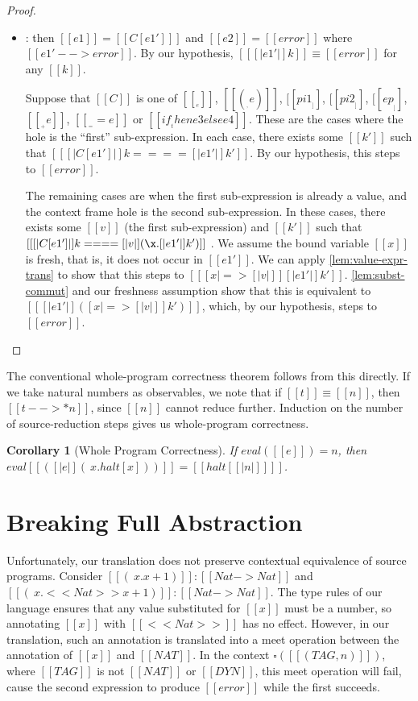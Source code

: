 \documentclass[11pt]{article}
\newtheorem{corollary}{Corollary}[section]
\newcommand{\rrule}[1]{\rref*{#1}}
\begin{document}
\begin{proof}
\begin{itemize}
		\item \rrule{RedContextFail}: then $[[e1]]=[[C[e1'] ]] $ and $[[e2]]=[[error]] $ where $[[e1' --> error]]$.
		By our hypothesis, $[[ [|e1'|]k ]] \equiv [[ error ]]$ for any $[[k]]$.

		Suppose that $[[C]]$ is one of $[[ __ e]]$, $[[(__, e)]]$, $[[pi1 __]]$, $[[pi2 __]]$, $[[ep __]]$,
		$[[__ + e]]$, $[[__ == e]]$ or $[[if __ then e3 else e4]]$. These are the cases where the hole is the ``first''
		sub-expression. 
		In each case, there exists some $[[k']]$ such that $[[ [|C[e1'] |]k ==== [|e1'|]k' ]]$. By our hypothesis,
		this steps to $[[error]]$.

		
		The remaining cases are when the first sub-expression is already a value, and the context frame hole is the second sub-expression.
		In these cases, there exists some $[[v]]$ (the first sub-expression) and $[[k']]$
		such that $[[ [|C[e1'] |]k ==== [|v|](\x . [|e1'|]k' ) ]]$ .
		We assume the bound variable $[[x]]$ is fresh, that is, it does not occur in $[[e1']]$.
		We can apply \autoref{lem:value-expr-trans} to show that this steps to $[[ [x |=> [|v|] ][|e1'|]k' ]]$.
		 \autoref{lem:subst-commut} and our freshness assumption 
		show that this is equivalent to
		$[[ [| e1' |]([x |=> [|v|] ]k') ]]$, which, by our hypothesis,
		steps to $[[error]]$.
		

		  
	\end{itemize}
\end{proof}

The conventional whole-program correctness theorem follows from this directly.
If we take natural numbers as observables, we note that if $[[t]]\equiv[[n]]$, then $[[t -->* n]]$,
since $[[n]]$ cannot reduce further. Induction on the number of source-reduction steps gives us whole-program correctness.

\begin{corollary}[Whole Program Correctness] 
	If ${eval([[e]])=n}$, then ${eval[[ ([|e|](\ x . halt [x]) )]]=[[halt [ [|n|] ] ]]}$.
\end{corollary}
 
\section{Breaking Full Abstraction}

Unfortunately, our translation does not preserve contextual equivalence of source programs.
Consider $[[(\ x . x + 1)]] : [[Nat -> Nat]]$ and $[[(\ x . <<Nat>>x + 1)]] : [[Nat -> Nat]]$.
The type rules of our language ensures that any value substituted for $[[x]]$ must be a number,
so annotating $[[x]]$ with $[[<<Nat>>]]$ has no effect.
However, in our translation, such an annotation is translated into a meet operation between the annotation
of $[[x]]$ and $[[NAT]]$. In the context $\square([[(TAG, n)]])$, where $[[TAG]]$ is not $[[NAT]]$ or $[[DYN]]$,
this meet operation will fail, cause the second expression to produce $[[error]]$ while the first succeeds.
 

  
\end{document}
